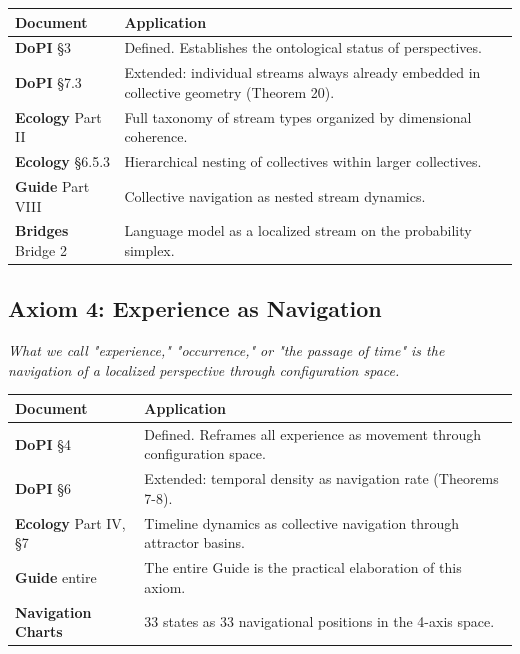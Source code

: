 \begin{longtable}{p{} p{}}
\toprule
\textbf{Document} & \textbf{Application} \\
\midrule
\endhead
\textbf{DoPI} §3 & Defined. Establishes the ontological status of perspectives. \\
\textbf{DoPI} §7.3 & Extended: individual streams always already embedded in collective geometry (Theorem 20). \\
\textbf{Ecology} Part II & Full taxonomy of stream types organized by dimensional coherence. \\
\textbf{Ecology} §6.5.3 & Hierarchical nesting of collectives within larger collectives. \\
\textbf{Guide} Part VIII & Collective navigation as nested stream dynamics. \\
\textbf{Bridges} Bridge 2 & Language model as a localized stream on the probability simplex. \\
\bottomrule
\end{longtable}



\subsection*{Axiom 4: Experience as Navigation}


\textit{What we call "experience," "occurrence," or "the passage of time" is the navigation of a localized perspective through configuration space.}



\begin{longtable}{p{} p{}}
\toprule
\textbf{Document} & \textbf{Application} \\
\midrule
\endhead
\textbf{DoPI} §4 & Defined. Reframes all experience as movement through configuration space. \\
\textbf{DoPI} §6 & Extended: temporal density as navigation rate (Theorems 7-8). \\
\textbf{Ecology} Part IV, §7 & Timeline dynamics as collective navigation through attractor basins. \\
\textbf{Guide} entire & The entire Guide is the practical elaboration of this axiom. \\
\textbf{Navigation Charts} & 33 states as 33 navigational positions in the 4-axis space. \\
\bottomrule
\end{longtable}



